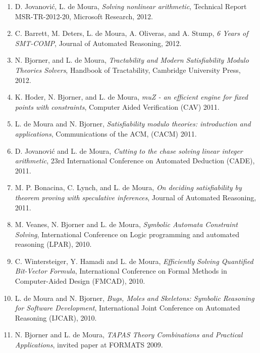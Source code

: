 \documentclass{article}
\begin{document}
\begin{enumerate}
\item D. Jovanovi\'{c}, L. de Moura,
      {\em Solving nonlinear arithmetic},
Technical Report MSR-TR-2012-20, Microsoft Research, 2012.

\item C. Barrett, M. Deters, L. de Moura, A. Oliveras, and A. Stump,
      {\em 6 Years of SMT-COMP},
Journal of Automated Reasoning, 2012.

\item N. Bjorner, and L. de Moura,
{\em Tractability and Modern Satisfiability Modulo Theories Solvers},
Handbook of Tractability, Cambridge University Press, 2012.

\item K. Hoder, N. Bjorner, and L. de Moura,
      {\em muZ - an efficient engine for fixed points with constraints},
Computer Aided Verification (CAV) 2011.

\item L. de Moura and N. Bjorner,
      {\em Satisfiability modulo theories: introduction and applications},
Communications of the ACM, (CACM) 2011.

\item D. Jovanovi\'{c} and L. de Moura,
      {\em Cutting to the chase solving linear integer arithmetic},
23rd International Conference on Automated Deduction (CADE), 2011.

\item M. P. Bonacina, C. Lynch, and L. de Moura,
      {\em On deciding satisfiability by theorem proving with speculative inferences},
Journal of Automated Reasoning, 2011.

\item M. Veanes, N. Bjorner and L. de Moura,
{\em Symbolic Automata Constraint Solving},
International Conference on Logic programming and automated reasoning (LPAR), 2010.

\item C. Wintersteiger, Y. Hamadi and L. de Moura,
{\em Efficiently Solving Quantified Bit-Vector Formula},
International Conference on Formal Methods in Computer-Aided Design (FMCAD), 2010.

\item L. de Moura and N. Bjorner,
{\em Bugs, Moles and Skeletons: Symbolic Reasoning for Software Development},
International Joint Conference on Automated Reasoning (IJCAR), 2010.

\item N. Bjorner and L. de Moura,
{\em TAPAS Theory Combinations and Practical Applications},
invited paper at FORMATS 2009.


\end{enumerate}
\end{document}
